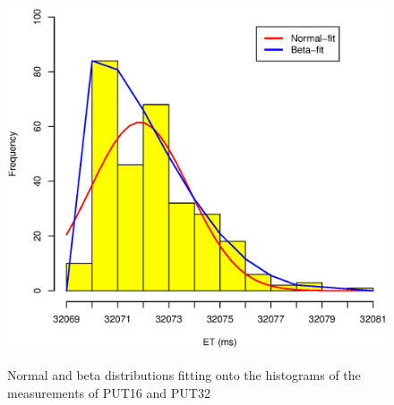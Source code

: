 \documentclass[10pt]{article}
\begin{document}
\begin{figure}[H]
{		\includegraphics[scale=0.43]{figures/sodb12-ntp-on-turbo-off/32_sec_et_hist.eps}
		\label{fig:32_sec_et_hist1}
	}
	\caption{Normal and beta distributions fitting onto the histograms of the measurements of PUT16 and PUT32~\label{fig:extra_pt_hist3}}
\end{figure}
\end{document}
